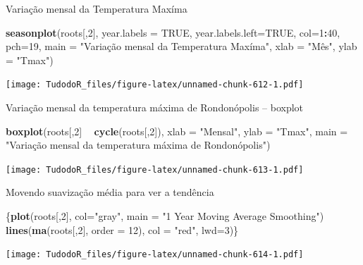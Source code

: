 \documentclass[
]{book}
\newenvironment{Shaded}{\begin{snugshade}}{\end{snugshade}}
\newcommand{\DataTypeTok}[1]{\textcolor[rgb]{0.13,0.29,0.53}{#1}}
\newcommand{\DecValTok}[1]{\textcolor[rgb]{0.00,0.00,0.81}{#1}}
\newcommand{\KeywordTok}[1]{\textcolor[rgb]{0.13,0.29,0.53}{\textbf{#1}}}
\newcommand{\NormalTok}[1]{#1}
\newcommand{\OperatorTok}[1]{\textcolor[rgb]{0.81,0.36,0.00}{\textbf{#1}}}
\newcommand{\OtherTok}[1]{\textcolor[rgb]{0.56,0.35,0.01}{#1}}
\newcommand{\StringTok}[1]{\textcolor[rgb]{0.31,0.60,0.02}{#1}}
\begin{document}
Variação mensal da Temperatura Maxíma

\begin{Shaded}
\begin{Highlighting}[]
\KeywordTok{seasonplot}\NormalTok{(roots[,}\DecValTok{2}\NormalTok{], }\DataTypeTok{year.labels =} \OtherTok{TRUE}\NormalTok{, }\DataTypeTok{year.labels.left=}\OtherTok{TRUE}\NormalTok{, }\DataTypeTok{col=}\DecValTok{1}\OperatorTok{:}\DecValTok{40}\NormalTok{, }\DataTypeTok{pch=}\DecValTok{19}\NormalTok{, }\DataTypeTok{main =} \StringTok{"Variação mensal da Temperatura Maxíma"}\NormalTok{, }\DataTypeTok{xlab =} \StringTok{"Mês", ylab = "}\NormalTok{Tmax}\StringTok{")}
\end{Highlighting}
\end{Shaded}

\texttt{[image: TudodoR\_files/figure-latex/unnamed-chunk-612-1.pdf]}

Variação mensal da temperatura máxima de Rondonópolis -- boxplot

\begin{Shaded}
\begin{Highlighting}[]
\KeywordTok{boxplot}\NormalTok{(roots[,}\DecValTok{2}\NormalTok{] }\OperatorTok{~}\StringTok{ }\KeywordTok{cycle}\NormalTok{(roots[,}\DecValTok{2}\NormalTok{]), }\DataTypeTok{xlab =} \StringTok{"Mensal"}\NormalTok{, }\DataTypeTok{ylab =} \StringTok{"Tmax"}\NormalTok{, }\DataTypeTok{main =} \StringTok{"Variação mensal da temperatura máxima de Rondonópolis")}
\end{Highlighting}
\end{Shaded}

\texttt{[image: TudodoR\_files/figure-latex/unnamed-chunk-613-1.pdf]}

Movendo suavização média para ver a tendência

\begin{Shaded}
\begin{Highlighting}[]
\NormalTok{\{}\KeywordTok{plot}\NormalTok{(roots[,}\DecValTok{2}\NormalTok{], }\DataTypeTok{col=}\StringTok{"gray"}\NormalTok{, }\DataTypeTok{main =} \StringTok{"1 Year Moving Average Smoothing"}\NormalTok{)}
\KeywordTok{lines}\NormalTok{(}\KeywordTok{ma}\NormalTok{(roots[,}\DecValTok{2}\NormalTok{], }\DataTypeTok{order =} \DecValTok{12}\NormalTok{), }\DataTypeTok{col =} \StringTok{"red"}\NormalTok{, }\DataTypeTok{lwd=}\DecValTok{3}\NormalTok{)\}}
\end{Highlighting}
\end{Shaded}

\texttt{[image: TudodoR\_files/figure-latex/unnamed-chunk-614-1.pdf]}
\end{document}
